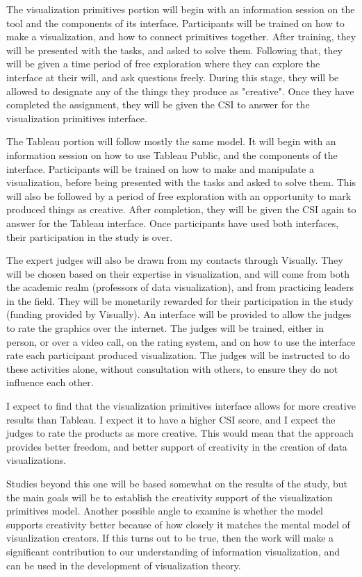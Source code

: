 The visualization primitives portion will begin with an information session on the tool and the components of its interface.
Participants will be trained on how to make a visualization, and how to connect primitives together.
After training, they will be presented with the tasks, and asked to solve them.
Following that, they will be given a time period of free exploration where they can explore the interface at their will, and ask questions freely.
During this stage, they will be allowed to designate any of the things they produce as "creative".
Once they have completed the assignment, they will be given the CSI to answer for the visualization primitives interface.

The Tableau portion will follow mostly the same model.
It will begin with an information session on how to use Tableau Public, and the components of the interface.
Participants will be trained on how to make and manipulate a visualization, before being presented with the tasks and asked to solve them.
This will also be followed by a period of free exploration with an opportunity to mark produced things as creative.
After completion, they will be given the CSI again to answer for the Tableau interface.
Once participants have used both interfaces, their participation in the study is over.

The expert judges will also be drawn from my contacts through Visually.
They will be chosen based on their expertise in visualization, and will come from both the academic realm (professors of data visualization), and from practicing leaders in the field.
They will be monetarily rewarded for their participation in the study (funding provided by Visually).
An interface will be provided to allow the judges to rate the graphics over the internet.
The judges will be trained, either in person, or over a video call, on the rating system, and on how to use the interface rate each participant produced visualization.
The judges will be instructed to do these activities alone, without consultation with others, to ensure they do not influence each other.

I expect to find that the visualization primitives interface allows for more creative results than Tableau.
I expect it to have a higher CSI score, and I expect the judges to rate the products as more creative.
This would mean that the approach provides better freedom, and better support of creativity in the creation of data visualizations.

Studies beyond this one will be based somewhat on the results of the study, but the main goals will be to establish the creativity support of the visualization primitives model.
Another possible angle to examine is whether the model supports creativity better because of how closely it matches the mental model of visualization creators.
If this turns out to be true, then the work will make a significant contribution to our understanding of information visualization, and can be used in the development of visualization theory.
